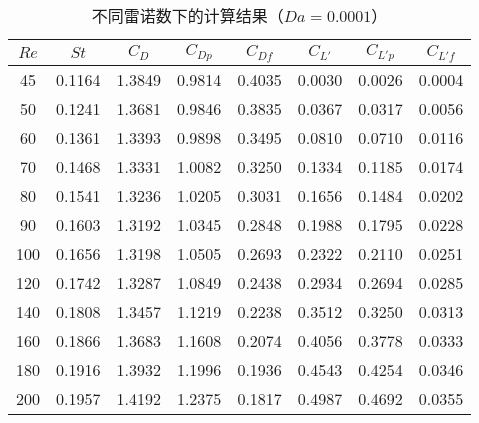 \begin{table}[ht]
	\caption{不同雷诺数下的计算结果（$Da=0.0001$）}\label{tab: results-1e-4}
	\vspace{.5em}\centering\wuhao
	\begin{tabular}{*{8}{c}}
		\toprule[1.5pt]
		$Re$ & $St$ & $C_D$ & $C_{Dp}$ & $C_{Df}$ & $C_{L'}$ & $C_{L'p}$ & $C_{L'f}$ \\
		\midrule[1pt]
		45  & 0.1164 & 1.3849 & 0.9814 & 0.4035 & 0.0030 & 0.0026 & 0.0004 \\
		50  & 0.1241 & 1.3681 & 0.9846 & 0.3835 & 0.0367 & 0.0317 & 0.0056 \\
		60  & 0.1361 & 1.3393 & 0.9898 & 0.3495 & 0.0810 & 0.0710 & 0.0116 \\
		70  & 0.1468 & 1.3331 & 1.0082 & 0.3250 & 0.1334 & 0.1185 & 0.0174 \\
		80  & 0.1541 & 1.3236 & 1.0205 & 0.3031 & 0.1656 & 0.1484 & 0.0202 \\
		90  & 0.1603 & 1.3192 & 1.0345 & 0.2848 & 0.1988 & 0.1795 & 0.0228 \\
		100 & 0.1656 & 1.3198 & 1.0505 & 0.2693 & 0.2322 & 0.2110 & 0.0251 \\
		120 & 0.1742 & 1.3287 & 1.0849 & 0.2438 & 0.2934 & 0.2694 & 0.0285 \\
		140 & 0.1808 & 1.3457 & 1.1219 & 0.2238 & 0.3512 & 0.3250 & 0.0313 \\
		160 & 0.1866 & 1.3683 & 1.1608 & 0.2074 & 0.4056 & 0.3778 & 0.0333 \\
		180 & 0.1916 & 1.3932 & 1.1996 & 0.1936 & 0.4543 & 0.4254 & 0.0346 \\
		200 & 0.1957 & 1.4192 & 1.2375 & 0.1817 & 0.4987 & 0.4692 & 0.0355 \\
		\bottomrule[1.5pt]
	\end{tabular}
\end{table}

